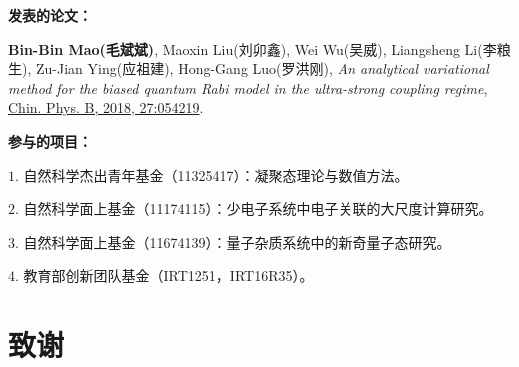 \documentclass[twoside]{LZUthesis}
\begin{document}
\begin{publications}{99}
\item[]  \textbf{发表的论文：}
\item \textbf{Bin-Bin Mao(毛斌斌)}, Maoxin Liu(刘卯鑫), Wei Wu(吴威), Liangsheng Li(李粮生), Zu-Jian Ying(应祖建), Hong-Gang Luo(罗洪刚), \textit{An analytical variational method for the biased quantum Rabi model in the ultra-strong coupling regime}, \href{http://iopscience.iop.org/article/10.1088/1674-1056/27/5/054219}{Chin. Phys. B, 2018, 27:054219}.

\item[]  \textbf{参与的项目：}
\item[$1.$]自然科学杰出青年基金（11325417）：凝聚态理论与数值方法。
\item[$2.$]自然科学面上基金（11174115）：少电子系统中电子关联的大尺度计算研究。
\item[$3.$]自然科学面上基金（11674139）：量子杂质系统中的新奇量子态研究。
\item[$4.$]教育部创新团队基金（IRT1251，IRT16R35）。

\end{publications}


\chapter{致谢}

\begin{thanks}

\end{thanks}
\end{document}
